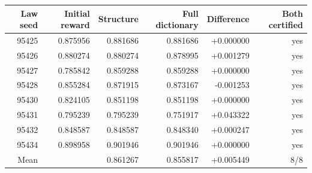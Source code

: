\begin{tabular}{rrrrrr}
\toprule
Law seed & Initial reward & Structure & Full dictionary & Difference & Both certified\\
\midrule
95425 & 0.875956 & 0.881686 & 0.881686 & +0.000000 & yes\\
95426 & 0.880274 & 0.880274 & 0.878995 & +0.001279 & yes\\
95427 & 0.785842 & 0.859288 & 0.859288 & +0.000000 & yes\\
95428 & 0.855284 & 0.871915 & 0.873167 & -0.001253 & yes\\
95430 & 0.824105 & 0.851198 & 0.851198 & +0.000000 & yes\\
95431 & 0.795239 & 0.795239 & 0.751917 & +0.043322 & yes\\
95432 & 0.848587 & 0.848587 & 0.848340 & +0.000247 & yes\\
95434 & 0.898958 & 0.901946 & 0.901946 & +0.000000 & yes\\
\midrule
Mean & & 0.861267 & 0.855817 & +0.005449 & 8/8\\
\bottomrule
\end{tabular}
